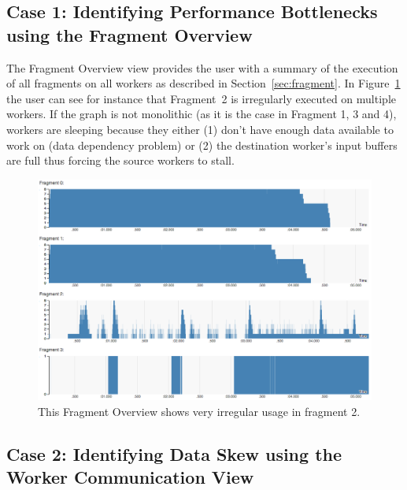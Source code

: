 \documentclass{chi2009}
\newcommand*{\network}{Worker Communication\xspace}
\newcommand*{\overall}{Fragment Overview\xspace}
\begin{document}


\subsection{Case 1: Identifying Performance Bottlenecks using the \overall}
\label{sec:case1}

The \overall view provides the user with a summary of the execution of all fragments
on all workers as described in
Section~\ref{sec:fragment}. In Figure~\ref{fig:overview_skew} the user can see for instance
that Fragment~2 is irregularly executed on multiple workers. 
If the graph is not monolithic (as it is the case in Fragment 1, 3 and 4), workers are sleeping because they
either (1) don't have enough data available to work on (data dependency problem) or (2) the destination worker's
input buffers are full thus forcing the source workers to stall.

\begin{figure}[ht]
  \includegraphics[width=\columnwidth]{images/overview_skew}
  \caption{This \overall shows very irregular usage in fragment 2.}
  \label{fig:overview_skew}
\end{figure}

\subsection{Case 2: Identifying Data Skew using the \network View}
\end{document}
